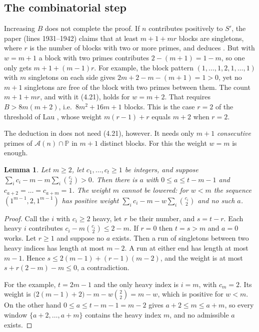 \documentclass[11pt,a4paper]{amsart}
\newtheorem{lemma}[theorem]{Lemma}
\theoremstyle{remark}
\newcommand{\cA}{\mathcal{A}}
\newcommand{\PP}{\mathbb{P}}
\begin{document}
\subsection{The combinatorial step}
Increasing $B$ does not complete the proof. If $n$ contributes positively to $S'$, the paper
(lines 1931--1942) claims that at least $m+1+mr$ blocks are singletons, where $r$ is the number of blocks with two or
more primes, and deduces \cite[(4.21)]{BFM}. But with $w=m+1$ a block with two primes contributes $2-(m+1)=1-m$, so
one only gets $m+1+(m-1)r$. For example, the block pattern $(1,\dots,1,2,1,\dots,1)$ with $m$ singletons on each side
gives $2m+2-m-(m+1)=1>0$, yet no $m+1$ singletons are free of the block with two primes between them.
The count $m+1+mr$, and with it (4.21), holds for $w=m+2$. That requires
$B>8m(m+2)$, i.e.\ $8m^2+16m+1$ blocks. This is the case $r=2$ of the threshold of Lau \cite{Lau}, whose
weight $m(r-1)+r$ equals $m+2$ when $r=2$.

The deduction in \cite[\S6]{BFM} does not need (4.21), however. It needs only $m+1$ \emph{consecutive} primes of
$\cA(n)\cap\PP$ in $m+1$ distinct blocks. For this the weight $w=m$ is enough.

\begin{lemma}\label{lem:comb}
Let $m\ge2$, let $c_1,\dots,c_t\ge1$ be integers, and suppose $\sum_ic_i-m-m\sum_i\binom{c_i}2>0$. Then there is
$a$ with $0\le a\le t-m-1$ and $c_{a+2}=\dots=c_{a+m}=1$. The weight $m$ cannot be lowered: for $w<m$ the
sequence $(1^{m-1},2,1^{m-1})$ has positive weight $\sum_ic_i-m-w\sum_i\binom{c_i}2$ and no such $a$.
\end{lemma}

\begin{proof}
Call the $i$ with $c_i\ge2$ heavy, let $r$ be their number, and $s=t-r$. Each heavy $i$ contributes
$c_i-m\binom{c_i}2\le2-m$. If $r=0$ then $t=s>m$ and $a=0$ works. Let $r\ge1$ and suppose no $a$ exists. Then a run
of singletons between two heavy indices has length at most $m-2$. A run at either end has length at most $m-1$.
Hence $s\le2(m-1)+(r-1)(m-2)$, and the weight is at most $s+r(2-m)-m\le0$, a contradiction.

For the example, $t=2m-1$ and the only heavy index is $i=m$, with $c_m=2$. Its weight is
$\bigl(2(m-1)+2\bigr)-m-w\binom22=m-w$, which is positive for $w<m$. On the other hand $0\le a\le t-m-1=m-2$ gives
$a+2\le m\le a+m$, so every window $\{a+2,\dots,a+m\}$ contains the heavy index $m$, and no admissible $a$ exists.
\end{proof}
\end{document}
